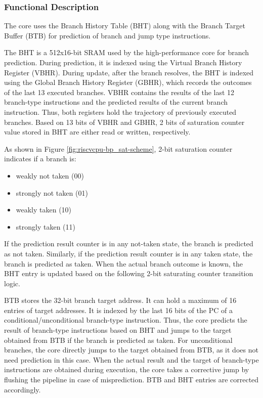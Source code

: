\documentclass[main\_\_EN.tex]{subfiles}
\begin{document}
\subsubsection{Functional Description}
\label{sec:riscvcpu-perf-bp-func-descr}

The core uses the Branch History Table (BHT) along with the Branch Target Buffer (BTB) for prediction of branch and jump type instructions.

The BHT is a 512x16-bit SRAM used by the high-performance core for branch prediction. During prediction, it is indexed using the Virtual Branch History Register (VBHR). During update, after the branch resolves, the BHT is indexed using the Global Branch History Register (GBHR), which records the outcomes of the last 13 executed branches. VBHR contains the results of the last 12 branch-type instructions and the predicted results of the current branch instruction. Thus, both registers hold the trajectory of previously executed branches. Based on 13 bits of VBHR and GBHR, 2 bits of saturation counter value stored in BHT are either read or written, respectively.

As shown in Figure \ref{fig:riscvcpu-bp_sat-scheme}, 2-bit saturation counter indicates if a branch is:

\begin{itemize}
    \item weakly not taken (00)
    \item strongly not taken (01)
    \item weakly taken (10)
    \item strongly taken (11)
\end{itemize}

If the prediction result counter is in any not-taken state, the branch is predicted as not taken. Similarly, if the prediction result counter is in any taken state, the branch is predicted as taken. When the actual branch outcome is known, the BHT entry is updated based on the following 2-bit saturating counter transition logic.

BTB stores the 32-bit branch target address. It can hold a maximum of 16 entries of target addresses. It is indexed by the last 16 bits of the PC of a conditional/unconditional branch-type instruction. Thus, the core predicts the result of branch-type instructions based on BHT and jumps to the target obtained from BTB if the branch is predicted as taken. For unconditional branches, the core directly jumps to the target obtained from BTB, as it does not need prediction in this case. When the actual result and the target of branch-type instructions are obtained during execution, the core takes a corrective jump by flushing the pipeline in case of misprediction. BTB and BHT entries are corrected accordingly.
\end{document}
